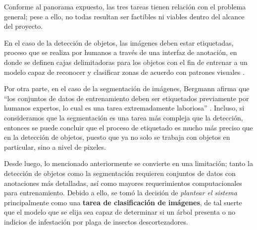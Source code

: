 Conforme al panorama expuesto, las tres tareas tienen relación con el problema general; pese a ello, no todas resultan ser factibles ni viables dentro del alcance del proyecto. 

En el caso de la detección de objetos, las imágenes deben estar etiquetadas, proceso que se realiza por humanos a través de una interfaz de anotación, en donde se definen cajas delimitadoras para los objetos con el fin de entrenar a un modelo capaz de reconocer y clasificar zonas de acuerdo con patrones visuales \cite{murel2026object_detection}.

Por otra parte, en el caso de la segmentación de imágenes, Bergmann afirma que “los conjuntos de datos de entrenamiento deben ser etiquetados previamente por humanos expertos, lo cual es una tarea extremadamente laboriosa” \cite{bergmann2026image_segmentation}. Incluso, si consideramos que la segmentación es una tarea más compleja que la detección, entonces se puede concluir que el proceso de etiquetado es mucho más preciso que en la detección de objetos, puesto que ya no solo se trabaja con objetos en particular, sino a nivel de pixeles.

Desde luego, lo mencionado anteriormente se convierte en una limitación; tanto la detección de objetos como la segmentación requieren conjuntos de datos con anotaciones más detalladas, así como mayores requerimientos computacionales para entrenamiento. Debido a ello, se tomó la decisión de \textit{plantear el sistema} principalmente como una \textbf{tarea de clasificación de imágenes}, de tal suerte que el modelo que se elija sea capaz de determinar si un árbol presenta o no indicios de infestación por plaga de insectos descortezadores.



